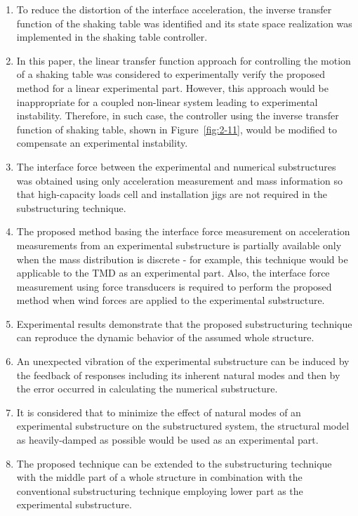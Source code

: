 \begin{enumerate}
\item To reduce the distortion of the interface acceleration, the inverse transfer function of the shaking table was identified and its state space realization was implemented in the shaking table controller.
\item In this paper, the linear transfer function approach for controlling the motion of a shaking table was considered to experimentally verify the proposed method for a linear experimental part. However, this approach would be inappropriate for a coupled non-linear system leading to experimental instability. Therefore, in such case, the controller using the inverse transfer function of shaking table, shown in Figure~\ref{fig:2-11}, would be modified to compensate an experimental instability.
\item The interface force between the experimental and numerical substructures was obtained using only acceleration measurement and mass information so that high-capacity loads cell and installation jigs are not required in the substructuring technique.
\item The proposed method basing the interface force measurement on acceleration measurements from an experimental substructure is partially available only when the mass distribution is discrete - for example, this technique would be applicable to the TMD as an experimental part. Also, the interface force measurement using force transducers is required to perform the proposed method when wind forces are applied to the experimental substructure.
\item Experimental results demonstrate that the proposed substructuring technique can reproduce the dynamic behavior of the assumed whole structure.
\item An unexpected vibration of the experimental substructure can be induced by the feedback of responses including its inherent natural modes and then by the error occurred in calculating the numerical substructure.
\item It is considered that to minimize the effect of natural modes of an experimental substructure on the substructured system, the structural model as heavily-damped as possible would be used as an experimental part.
\item The proposed technique can be extended to the substructuring technique with the middle part of a whole structure in combination with the conventional substructuring technique employing lower part as the experimental substructure.

\end{enumerate}
